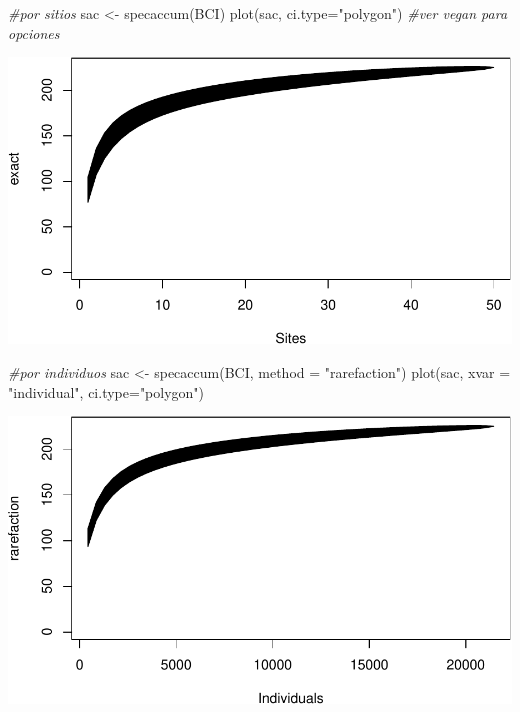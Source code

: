 \documentclass[
]{article}
\newenvironment{Shaded}{\begin{snugshade}}{\end{snugshade}}
\newcommand{\AttributeTok}[1]{\textcolor[rgb]{0.77,0.63,0.00}{#1}}
\newcommand{\CommentTok}[1]{\textcolor[rgb]{0.56,0.35,0.01}{\textit{#1}}}
\newcommand{\FunctionTok}[1]{\textcolor[rgb]{0.00,0.00,0.00}{#1}}
\newcommand{\NormalTok}[1]{#1}
\newcommand{\OtherTok}[1]{\textcolor[rgb]{0.56,0.35,0.01}{#1}}
\newcommand{\StringTok}[1]{\textcolor[rgb]{0.31,0.60,0.02}{#1}}
\begin{document}
\begin{Shaded}
\begin{Highlighting}[]
\CommentTok{\#por sitios}
\NormalTok{sac }\OtherTok{\textless{}{-}} \FunctionTok{specaccum}\NormalTok{(BCI)}
\FunctionTok{plot}\NormalTok{(sac, }\AttributeTok{ci.type=}\StringTok{"polygon"}\NormalTok{) }\CommentTok{\#ver vegan para opciones}
\end{Highlighting}
\end{Shaded}

\includegraphics{Clase1-bioest_files/figure-latex/unnamed-chunk-44-1.pdf}

\begin{Shaded}
\begin{Highlighting}[]
\CommentTok{\#por individuos}
\NormalTok{sac }\OtherTok{\textless{}{-}} \FunctionTok{specaccum}\NormalTok{(BCI, }\AttributeTok{method =} \StringTok{"rarefaction"}\NormalTok{)}
\FunctionTok{plot}\NormalTok{(sac, }\AttributeTok{xvar =} \StringTok{"individual"}\NormalTok{, }\AttributeTok{ci.type=}\StringTok{"polygon"}\NormalTok{) }
\end{Highlighting}
\end{Shaded}

\includegraphics{Clase1-bioest_files/figure-latex/unnamed-chunk-44-2.pdf}
\end{document}
